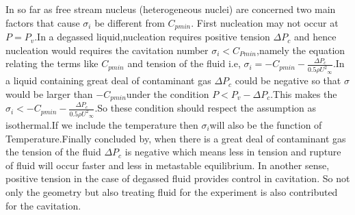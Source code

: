   In so far as free stream nucleus (heterogeneous nuclei) are concerned two main factors that cause ${\sigma}_i$ be different from $C_{pmin}$.
  First nucleation may not occur at $P=P_v$.In a degassed liquid,nucleation requires positive tension $\Delta P_c$ and hence nucleation would requires the cavitation number ${{\sigma}_i} <$$C_{Pmin}$,namely the equation relating the terms like $C_{pmin}$ and tension of the fluid i.e,
  ${{\sigma}_i}=$${-C_{pmin}}-$$\frac {{\Delta}P_c}{0.5 \rho {{{U}^2}_\infty}}$.In a liquid containing great deal of contaminant gas $\Delta P_c$ could be negative so that ${\sigma}$ would be larger than ${-C_{pmin}}$under the condition $P<{P_v}-$${\Delta}P_c$.This makes the
  ${{\sigma}_i}<$${-C_{pmin}}-$$\frac {{\Delta}P_c}{0.5 \rho {{{U}^2}_\infty}}$.So these condition should respect the assumption as isothermal.If we include the temperature then ${\sigma}_i$will also
  be the function of Temperature.Finally concluded by, when there is a great deal of contaminant gas the tension of the fluid ${\Delta}P_c$ is negative which means less in tension and rupture of fluid will
  occur faster and less in metastable equilibrium. In another sense, positive tension in the case of degassed fluid provides control in cavitation. So not only the geometry but also treating fluid for the experiment 
  is also contributed for the cavitation.
